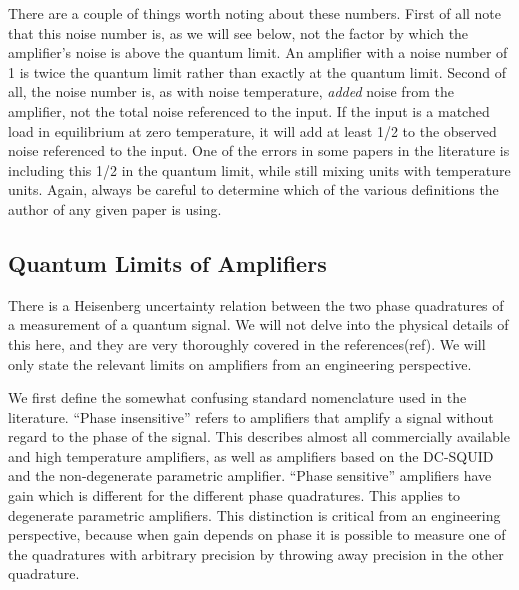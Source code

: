 \documentclass{report}
\begin{document}
There are a couple of things worth noting about these numbers.  First of all note that this noise number is, as we will see below, not the factor by which the amplifier's noise is above the quantum limit.  An amplifier with a noise number of 1 is twice the quantum limit rather than exactly at the quantum limit.  Second of all, the noise number is, as with noise temperature, \textit{added} noise from the amplifier, not the total noise referenced to the input.  If the input is a matched load in equilibrium at zero temperature, it will add at least 1/2 to the observed noise referenced to the input.  One of the errors in some papers in the literature is including this 1/2 in the quantum limit, while still mixing units with temperature units.  Again, always be careful to determine which of the various definitions the author of any given paper is using.

\subsection{Quantum Limits of Amplifiers}

	There is a Heisenberg uncertainty relation between the two phase quadratures of a measurement of a quantum signal. We will not delve into the physical details of this here, and they are very thoroughly covered in the references(ref).  We will only state the relevant limits on amplifiers from an engineering perspective.  

	We first define the somewhat confusing standard nomenclature used in the literature.  ``Phase insensitive'' refers to amplifiers that amplify a signal without regard to the phase of the signal.  This describes almost all commercially available and high temperature amplifiers, as well as amplifiers based on the DC-SQUID and the non-degenerate parametric amplifier.  ``Phase sensitive'' amplifiers have gain which is different for the different phase quadratures.  This applies to degenerate parametric amplifiers.  This distinction is critical from an engineering perspective, because when gain depends on phase it is possible to measure one of the quadratures with arbitrary precision by throwing away precision in the other quadrature.  
\end{document}
